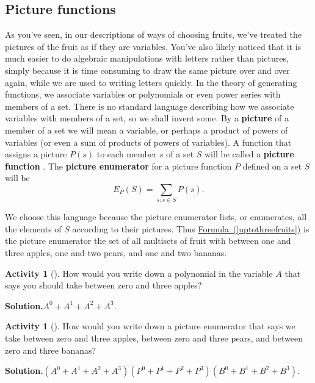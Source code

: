 \documentclass[10pt,]{book}
\newcommand{\terminology}[1]{\textbf{#1}}
\theoremstyle{plain}
\theoremstyle{definition}
\newtheorem{activity}[project]{Activity}
\numberwithin{equation}{chapter}
\begin{document}
\subsection[{Picture functions}]{Picture functions}\label{picturefunction}
As you've seen, in our descriptions of ways of choosing fruits, we've treated the pictures of the fruit as if they are variables. You've also likely noticed that it is much easier to do algebraic manipulations with letters rather than pictures, simply because it is time consuming to draw the same picture over and over again, while we are used to writing letters quickly. In the theory of generating functions, we associate variables or polynomials or even power series with members of a set. There is no standard language describing how we associate variables with members of a set, so we shall invent some. By a \terminology{picture} of a member of a set we will mean a variable, or perhaps a product of powers of variables (or even a sum of products of powers of variables). A function that assigns a picture \(P(s)\) to each member \(s\) of a set \(S\) will be called a \terminology{picture function} . The \terminology{picture enumerator} for a picture function \(P\) defined on a set \(S\) will be%
\begin{equation*}
E_P(S) = \sum_{s: s\in S}  P(s).
\end{equation*}
%
\par
We choose this language because the picture enumerator lists, or enumerates, all the elements of \(S\) according to their pictures. Thus \hyperref[uptothreefruits]{Formula~(\ref{uptothreefruits})} is the picture enumerator the set of all multisets of fruit with between one and three apples, one and two pears, and one and two bananas.%
\begin{activity}[]\label{zerotothreeapples}
How would you write down a polynomial in the variable \(A\) that says you should take between zero and three apples?%
\par\medskip\noindent%
\textbf{Solution.}\quad \(A^0+A^1+A^2+A^3\).%
\end{activity}
\begin{activity}[]\label{zerotothreefruits}
How would you write down a picture enumerator that says we take between zero and three apples, between zero and three pears, and between zero and three bananas?%
\par\medskip\noindent%
\textbf{Solution.}\quad \((A^0+A^1+A^2+A^3)(P^0+P^1+P^2+P^3)(B^0+B^1+B^2+B^3).\)%
\end{activity}
\end{document}
